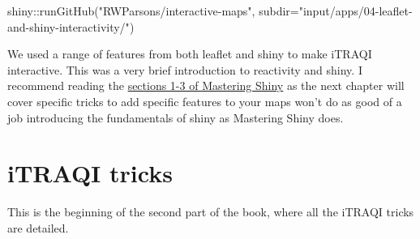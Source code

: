 \documentclass[
]{book}
\newenvironment{Shaded}{\begin{snugshade}}{\end{snugshade}}
\newcommand{\AttributeTok}[1]{\textcolor[rgb]{0.77,0.63,0.00}{#1}}
\newcommand{\FunctionTok}[1]{\textcolor[rgb]{0.00,0.00,0.00}{#1}}
\newcommand{\NormalTok}[1]{#1}
\newcommand{\SpecialCharTok}[1]{\textcolor[rgb]{0.00,0.00,0.00}{#1}}
\newcommand{\StringTok}[1]{\textcolor[rgb]{0.31,0.60,0.02}{#1}}
\begin{document}
\begin{Shaded}
\begin{Highlighting}[]
\NormalTok{shiny}\SpecialCharTok{::}\FunctionTok{runGitHub}\NormalTok{(}\StringTok{"RWParsons/interactive{-}maps"}\NormalTok{, }\AttributeTok{subdir=}\StringTok{"input/apps/04{-}leaflet{-}and{-}shiny{-}interactivity/"}\NormalTok{)}
\end{Highlighting}
\end{Shaded}

We used a range of features from both leaflet and shiny to make iTRAQI interactive. This was a very brief introduction to reactivity and shiny. I recommend reading the \href{https://mastering-shiny.org/basic-app.html}{sections 1-3 of Mastering Shiny} as the next chapter will cover specific tricks to add specific features to your maps won't do as good of a job introducing the fundamentals of shiny as Mastering Shiny does.

\hypertarget{iTRAQI-tricks}{%
\chapter{iTRAQI tricks}\label{iTRAQI-tricks}}

This is the beginning of the second part of the book, where all the iTRAQI tricks are detailed.
\end{document}

